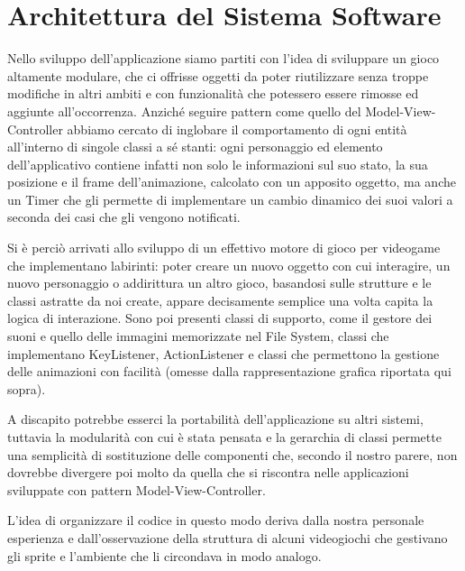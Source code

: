 \documentclass[12pt,a4paper]{report}
\begin{document}
\section{Architettura del Sistema Software}\label{ch:arch}
Nello sviluppo dell’applicazione siamo partiti con l'idea di sviluppare un gioco altamente modulare, che ci offrisse oggetti da poter riutilizzare senza troppe modifiche in altri ambiti e con funzionalità che potessero essere rimosse ed aggiunte all’occorrenza. Anziché seguire pattern come quello del Model-View-Controller abbiamo cercato di inglobare il comportamento di ogni entità all’interno di singole classi a sé stanti: ogni personaggio ed elemento dell’applicativo contiene infatti non solo le informazioni sul suo stato, la sua posizione e il frame dell’animazione, calcolato con un apposito oggetto, ma anche un Timer che gli permette di implementare un cambio dinamico dei suoi valori a seconda dei casi che gli vengono notificati.

Si è perciò arrivati allo sviluppo di un effettivo motore di gioco per videogame che implementano labirinti: poter creare un nuovo oggetto con cui interagire, un nuovo personaggio o addirittura un altro gioco, basandosi sulle strutture e le classi astratte da noi create, appare decisamente semplice una volta capita la logica di interazione. Sono poi presenti classi di supporto, come il gestore dei suoni e quello delle immagini memorizzate nel File System, classi che implementano KeyListener, ActionListener e classi che permettono la gestione delle animazioni con facilità (omesse dalla rappresentazione grafica riportata qui sopra).

A discapito potrebbe esserci la portabilità dell’applicazione su altri sistemi, tuttavia la modularità con cui è stata pensata e la gerarchia di classi permette una semplicità di sostituzione delle componenti che, secondo il nostro parere, non dovrebbe divergere poi molto da quella che si riscontra nelle applicazioni sviluppate con pattern Model-View-Controller.

L'idea di organizzare il codice in questo modo deriva dalla nostra personale esperienza e dall’osservazione della struttura di alcuni videogiochi che gestivano gli sprite e l’ambiente che li circondava in modo analogo.
\end{document}
